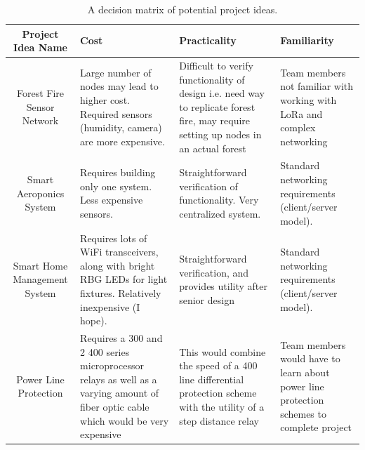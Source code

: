 \documentclass{article}
\begin{document}
\begin{table}[H]
    \centering
    
    \begin{tabularx}{\linewidth}{|c|X|X|X|}
        \hline
        Project Idea Name & Cost & Practicality & Familiarity \\
        \hline
        Forest Fire Sensor Network &
        Large number of nodes may lead to higher cost. Required sensors (humidity, camera) are more expensive. &
        Difficult to verify functionality of design i.e. need way to replicate forest fire, may require setting up nodes in an actual forest &
        Team members not familiar with working with LoRa and complex networking \\\hline
        
        Smart Aeroponics System &
        Requires building only one system. Less expensive sensors. &
        Straightforward verification of functionality. Very centralized system. &
        Standard networking requirements (client/server model). \\\hline
        
        Smart Home Management System 
        & Requires lots of WiFi transceivers, along with bright RBG LEDs for light fixtures. Relatively inexpensive (I hope).
        & Straightforward verification, and provides utility after senior design
        & Standard networking requirements (client/server model).
        \\\hline
        
        Power Line Protection 
        & Requires a 300 and 2 400 series microprocessor relays as well as a varying amount of fiber optic cable which would be very expensive
        & This would combine the speed of a 400 line differential protection scheme with the utility of a step distance relay
        & Team members would have to learn about power line protection schemes to complete project
        \\\hline
        
    \end{tabularx}
    \caption{A decision matrix of potential project ideas.}
\end{table}
\end{document}
